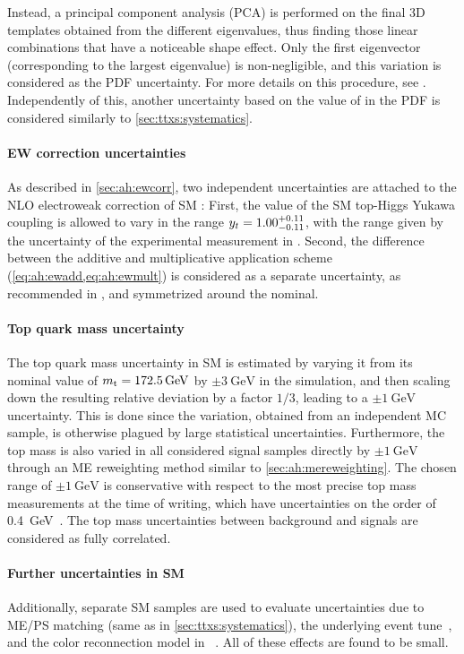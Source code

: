 Instead, a principal component analysis (PCA) is performed on the final 3D \mttchelchan templates obtained from the different eigenvalues, thus finding those linear combinations that have a noticeable shape effect. Only the first eigenvector (corresponding to the largest eigenvalue) is non-negligible, and this variation is considered as the PDF uncertainty. For more details on this procedure, see . Independently of this, another uncertainty based on the value of \alphas in the PDF is considered similarly to \cref{sec:ttxs:systematics}.

\paragraph{EW correction uncertainties}
As described in \cref{sec:ah:ewcorr}, two independent uncertainties are attached to the NLO electroweak correction of SM {\ttbar}: First, the value of the SM top-Higgs Yukawa coupling is allowed to vary in the range $y_t = {1.00}^{+0.11}_{-0.11}$, with the range given by the uncertainty of the experimental measurement in . Second, the difference between the additive and multiplicative application scheme (\cref{eq:ah:ewadd,eq:ah:ewmult}) is considered as a separate uncertainty, as recommended in , and symmetrized around the nominal.

\paragraph{Top quark mass uncertainty}
The top quark mass uncertainty in SM \ttbar is estimated by varying it from its nominal value of $\mt = \SI{172.5}{\GeV}$ by $\pm \SI{3}{\GeV}$ in the \powheg simulation, and then scaling down the resulting relative deviation by a factor $1/3$, leading to a $\pm \SI{1}{\GeV}$ uncertainty. This is done since the variation, obtained from an independent MC sample, is otherwise plagued by large statistical uncertainties. Furthermore, the top mass is also varied in all considered signal samples directly by $\pm \SI{1}{\GeV}$ through an ME reweighting method similar to \cref{sec:ah:mereweighting}. The chosen range of $\pm \SI{1}{\GeV}$ is conservative with respect to the most precise top mass measurements at the time of writing, which have uncertainties on the order of \SI{0.4}{\GeV}~\cite{CMS:TOP-20-008,ATLASCMS:2024dxp}. The top mass uncertainties between background and signals are considered as fully correlated.

\paragraph{Further uncertainties in SM \ttbar}
Additionally, separate SM \ttbar samples are used to evaluate uncertainties due to ME/PS matching (same as in \cref{sec:ttxs:systematics}), the underlying event tune~\cite{CMS:GEN-17-001}, and the color reconnection model in \pythia~\cite{CMS:GEN-17-002,Christiansen:2015yqa}. All of these effects are found to be small.

